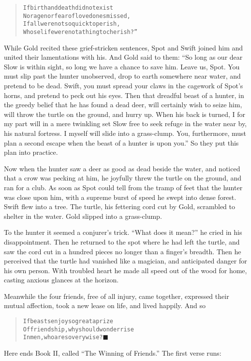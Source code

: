 \documentclass[article, twoside, 14pt]{memoir}
\newcommand{\qed}{\hfill \ensuremath{\blacksquare}}
\renewenvironment{verbatim}{%
\begin{quote}%
\vskip -10pt%
\begin{alltt}\normalfont\large}{\end{alltt}%
\end{quote}%
\vskip -10pt
} %
\begin{document}
\begin{verbatim}
If birth and death did not exist
Nor age nor fear of loved ones missed,
If all were not so quick to perish,
Whose life were not a thing to cherish?”
\end{verbatim}
While Gold recited these grief-stricken sentences, Spot and Swift
joined him and united their lamentations with his. And Gold said to
them:
``So long as our dear Slow is within sight, so long we have a chance to save him. Leave us, Spot. You must slip past the hunter unobserved, drop to earth somewhere near water, and pretend to be dead. Swift, you must spread your claws in the cagework of Spot's horns, and pretend to peck out his eyes. Then that dreadful beast of a hunter, in the greedy belief that he has found a dead deer, will certainly wish to seize him, will throw the turtle on the ground, and hurry up. When his back is turned, I for my part will in a mere twinkling set Slow free to seek refuge in the water near by, his natural fortress. I myself will slide into a grass-clump. You, furthermore, must plan a second escape when the beast of a hunter is upon you.''
So they put this plan into practice.

Now when the hunter saw a deer as good as dead beside the
water, and noticed that a crow was pecking at him, he joyfully
threw the turtle on the ground, and ran for a club. As soon as Spot
could tell from the tramp of feet that the hunter was close upon
him, with a supreme burst of speed he swept into dense forest.
Swift flew into a tree. The turtle, his fettering cord cut by Gold,
scrambled to shelter in the water. Gold slipped into a
grass-clump.

To the hunter it seemed a conjurer's trick. ``What does it mean?''
he cried in his disappointment. Then he returned to the spot where
he had left the turtle, and saw the cord cut in a hundred pieces no
longer than a finger's breadth. Then he perceived that the turtle
had vanished like a magician, and anticipated danger for his own
person. With troubled heart he made all speed out of the wood for
home, casting anxious glances at the horizon.

Meanwhile the four friends, free of all injury, came together,
expressed their mutual affection, took a new lease on life, and
lived happily. And so

\begin{verbatim}
If beasts enjoy so great a prize
Of friendship, why should wonder rise
In men, who are so very wise?\hyperref[s36]{\qed}
\end{verbatim}
Here ends Book II, called ``The Winning of Friends.'' The first
verse runs:
\end{document}
